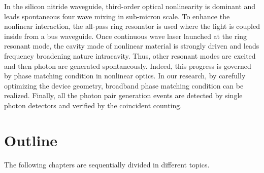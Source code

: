 In the silicon nitride waveguide, third-order optical nonlinearity is dominant and leads spontaneous four wave mixing in sub-micron scale. 
To enhance the nonlinear interaction, the all-pass ring resonator is used where the light is coupled inside from a bus waveguide. Once continuous wave laser launched at the ring resonant mode, the cavity made of nonlinear material is strongly driven and leads frequency broadening nature intracavity. Thus, other resonant modes are excited and then photon are generated spontaneously. Indeed, this progress is governed by phase matching condition in nonlinear optics.
In our research, by carefully optimizing the device geometry, broadband phase matching condition can be realized. 
Finally, all the photon pair generation events are detected by single photon detectors and verified by the coincident counting.

\newpage

\section{Outline}
The following chapters are sequentially divided in different topics.
